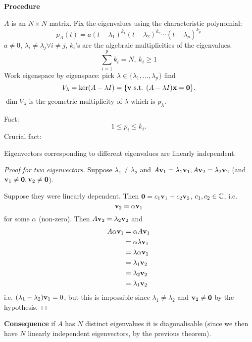 \documentclass[10pt, a4paper]{article}
\begin{document}
\textbf{Procedure}

$A$ is an $N \times N$ matrix.
Fix the eigenvalues using the characteristic polynomial:
\[
p_A(t) = a(t - \lambda_1) ^ {k_1}(t - \lambda_2) ^ {k_2} \dotsi (t - \lambda_p) ^ {k_p}
\]
$a \neq 0$,
$\lambda_i \neq \lambda_j \forall i \neq j$,
$k_i$'s are the algebraic multiplicities of the eigenvalues.
\[
\sum_{i = 1}^{p}k_i = N,\  k_i \geq 1
\]
Work eigenspace by eigenspace:
pick $\lambda \in \{\lambda_1, \dotsc, \lambda_p\}$ find
\[
V_{\lambda} = \ker(A - \lambda I) = \{\mathbf{v} \text{ s.t. } (A - \lambda I)\mathbf{x} = \mathbf{0}\}.
\]
$\dim{V_{\lambda}}$ is the geometric multiplicity of $\lambda$ which is $p_{\lambda}$.

Fact:
\[
1 \leq p_i \leq k_i.
\]
Crucial fact:
\begin{proposition}
    Eigenvectors corresponding to different eigenvalues are linearly independent.

    \begin{proof}[Proof for two eigenvectors]
        Suppose $\lambda_1 \neq \lambda_2$ and $A\mathbf{v}_1 = \lambda_1\mathbf{v}_1, A\mathbf{v}_2 = \lambda_2\mathbf{v}_2$
        (and $\mathbf{v}_1 \neq \mathbf{0}, \mathbf{v}_2 \neq \mathbf{0}$).

        Suppose they were linearly dependent.
        Then $\mathbf{0} = c_1\mathbf{v}_1 + c_2\mathbf{v}_2$,
        $c_1, c_2 \in \mathbb{C}$,
        i.e.
        \[
        \mathbf{v}_2 = \alpha\mathbf{v}_1
        \]
        for some $\alpha$
        (non-zero).
        Then $A\mathbf{v}_2 = \lambda_2\mathbf{v}_2$
        and
        \begin{align*}
            A\alpha\mathbf{v}_1 &= \alpha A\mathbf{v}_1 \\
            &= \alpha\lambda\mathbf{v}_1 \\
            &= \lambda\alpha\mathbf{v}_1 \\
            &=  \lambda_1\mathbf{v}_2 \\
            &= \lambda_2\mathbf{v}_2 \\
            &= \lambda_1\mathbf{v}_2
        \end{align*}
        i.e. $(\lambda_1 - \lambda_2)\mathbf{v}_1 = 0$,
        but this is impossible since $\lambda_1 \neq \lambda_2$ and $\mathbf{v}_2 \neq \mathbf{0}$ by the hypothesis.
    \end{proof}
\end{proposition}

\textbf{Consequence}
if $A$ has $N$ distinct eigenvalues it is diagonalisable
(since we then have $N$ linearly independent eigenvectors,
by the previous theorem).
\end{document}
